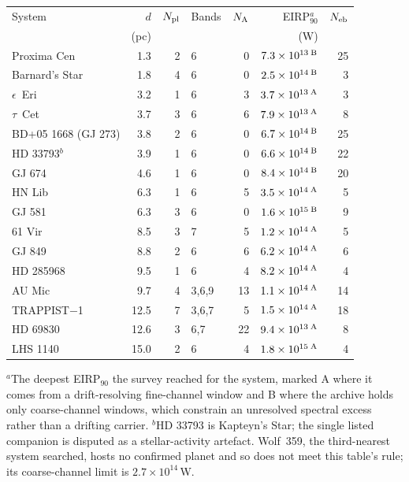 \begin{tabular}{@{}l@{~~}r@{~~}r@{~~}l@{~~}r@{~~}r@{~~}r@{}}
\hline
System & $d$ & $N_{\rm pl}$ & Bands & $N_{\rm A}$ & EIRP$_{90}^{a}$ & $N_{\rm eb}$ \\
 & (pc) & & & & (W) & \\
\hline
Proxima Cen & 1.3 & 2 & 6 & 0 & $7.3\times10^{13}\,^{\rm B}$ & 25 \\
Barnard's Star & 1.8 & 4 & 6 & 0 & $2.5\times10^{14}\,^{\rm B}$ & 3 \\
$\epsilon$~Eri & 3.2 & 1 & 6 & 3 & $3.7\times10^{13}\,^{\rm A}$ & 3 \\
$\tau$~Cet & 3.7 & 3 & 6 & 6 & $7.9\times10^{13}\,^{\rm A}$ & 8 \\
BD+05 1668 (GJ 273) & 3.8 & 2 & 6 & 0 & $6.7\times10^{14}\,^{\rm B}$ & 25 \\
HD 33793$^{b}$ & 3.9 & 1 & 6 & 0 & $6.6\times10^{14}\,^{\rm B}$ & 22 \\
GJ 674 & 4.6 & 1 & 6 & 0 & $8.4\times10^{14}\,^{\rm B}$ & 20 \\
HN Lib & 6.3 & 1 & 6 & 5 & $3.5\times10^{14}\,^{\rm A}$ & 5 \\
GJ 581 & 6.3 & 3 & 6 & 0 & $1.6\times10^{15}\,^{\rm B}$ & 9 \\
61 Vir & 8.5 & 3 & 7 & 5 & $1.2\times10^{14}\,^{\rm A}$ & 5 \\
GJ 849 & 8.8 & 2 & 6 & 6 & $6.2\times10^{14}\,^{\rm A}$ & 6 \\
HD 285968 & 9.5 & 1 & 6 & 4 & $8.2\times10^{14}\,^{\rm A}$ & 4 \\
AU Mic & 9.7 & 4 & 3,6,9 & 13 & $1.1\times10^{14}\,^{\rm A}$ & 14 \\
TRAPPIST$-$1 & 12.5 & 7 & 3,6,7 & 5 & $1.5\times10^{14}\,^{\rm A}$ & 18 \\
HD 69830 & 12.6 & 3 & 6,7 & 22 & $9.4\times10^{13}\,^{\rm A}$ & 8 \\
LHS 1140 & 15.0 & 2 & 6 & 4 & $1.8\times10^{15}\,^{\rm A}$ & 4 \\
\hline
\end{tabular}

{\footnotesize $^{a}$The deepest EIRP$_{90}$ the survey reached for the system, marked A where it comes from a drift-resolving fine-channel window and B where the archive holds only coarse-channel windows, which constrain an unresolved spectral excess rather than a drifting carrier. $^{b}$HD 33793 is Kapteyn's Star; the single listed companion is disputed as a stellar-activity artefact. Wolf~359, the third-nearest system searched, hosts no confirmed planet and so does not meet this table's rule; its coarse-channel limit is $2.7\times10^{14}$\,W.}
